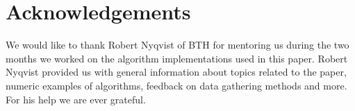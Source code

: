 \chapter{Acknowledgements}

We would like to thank Robert Nyqvist of BTH for mentoring us during the two months we worked on the algorithm implementations used in this paper. Robert Nyqvist provided us with general information about topics related to the paper, numeric examples of algorithms, feedback on data gathering methods and more. For his help we are ever grateful.